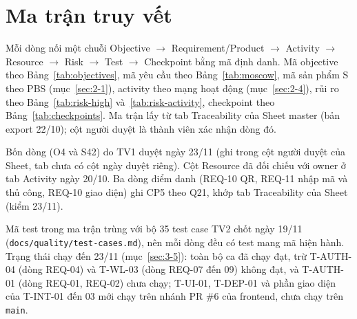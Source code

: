\chapter{Ma trận truy vết}
\label{chap:traceability}

Mỗi dòng nối một chuỗi Objective $\rightarrow$ Requirement/Product $\rightarrow$ Activity $\rightarrow$ Resource $\rightarrow$ Risk $\rightarrow$ Test $\rightarrow$ Checkpoint bằng mã định danh. Mã objective theo Bảng~\ref{tab:objectives}, mã yêu cầu theo Bảng~\ref{tab:moscow}, mã sản phẩm S theo PBS (mục~\ref{sec:2-1}), activity theo mạng hoạt động (mục~\ref{sec:2-4}), rủi ro theo Bảng~\ref{tab:risk-high} và~\ref{tab:risk-activity}, checkpoint theo Bảng~\ref{tab:checkpoints}. Ma trận lấy từ tab Traceability của Sheet master (bản export 22/10); cột người duyệt là thành viên xác nhận dòng đó.

Bốn dòng (O4 và S42) do TV1 duyệt ngày 23/11 (ghi trong cột người duyệt của Sheet, tab chưa có cột ngày duyệt riêng). Cột Resource đã đối chiếu với owner ở tab Activity ngày 20/10. Ba dòng điểm danh (REQ-10 QR, REQ-11 nhập mã và thủ công, REQ-10 giao diện) ghi CP5 theo Q21, khớp tab Traceability của Sheet (kiểm 23/11).

Mã test trong ma trận trùng với bộ 35 test case TV2 chốt ngày 19/11 (\texttt{docs/\allowbreak quality/\allowbreak test-cases.md}), nên mỗi dòng đều có test mang mã hiện hành. Trạng thái chạy đến 23/11 (mục~\ref{sec:3-5}): toàn bộ ca đã chạy đạt, trừ T-AUTH-04 (dòng REQ-04) và T-WL-03 (dòng REQ-07 đến 09) không đạt, và T-AUTH-01 (dòng REQ-01, REQ-02) chưa chạy; T-UI-01, T-DEP-01 và phần giao diện của T-INT-01 đến 03 mới chạy trên nhánh PR \#6 của frontend, chưa chạy trên \texttt{main}.

